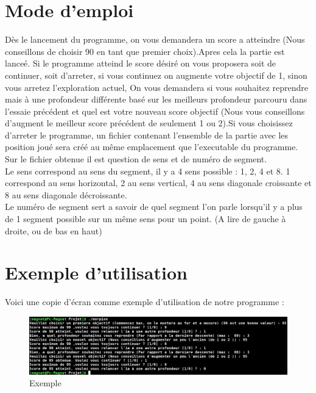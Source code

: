 \documentclass[11pt]{article}
\begin{document}
\section{Mode d'emploi}
		Dès le lancement du programme, on vous demandera un score a atteindre (Nous conseillons de choisir 90 en tant que premier choix).\newline Apres cela la partie est lanceé. Si le programme atteind le score désiré on vous proposera soit de continuer, soit d'arreter, si vous continuez on augmente votre objectif de 1, sinon vous arretez l'exploration actuel, On vous demandera si vous souhaitez reprendre mais à une profondeur différente basé sur les meilleurs profondeur parcouru dans l'essaie précédent et quel est votre nouveau score objectif (Nous vous conseillons d'augment le meilleur score précédent de seulement 1 ou 2).\newline Si vous choisissez d'arreter le programme, un fichier contenant l'ensemble de la partie avec les position joué sera créé au même emplacement que l'executable du programme.\\Sur le fichier obtenue il est question de sens et de numéro de segment.\\Le sens correspond au sens du segment, il y a 4 sens possible : 1, 2, 4 et 8. 1 correspond au sens horizontal, 2 au sens vertical, 4 au sens diagonale croissante et 8 au sens diagonale décroissante.\\Le numéro de segment sert a savoir de quel segment l'on parle lorsqu'il y a plus de 1 segment possible sur un même sens pour un point. (A lire de gauche à droite, ou de bas en haut)
		
		\section{Exemple d'utilisation}
		Voici une copie d'écran comme exemple d'utilisation de notre programme :
		\newpage
		\begin{figure}[!h]
\centering
\includegraphics[scale=1.40]{screenderoulement.png}
\caption{Exemple}
\label{}
\end{figure}
\end{document}
